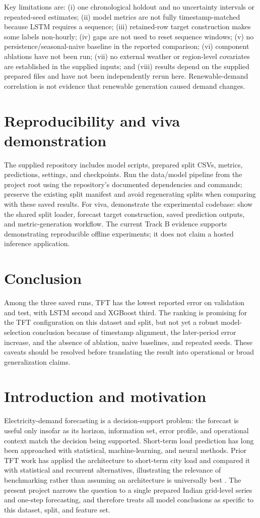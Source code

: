 \documentclass[12pt,a4paper]{article}
\begin{document}
Key limitations are: (i) one chronological holdout and no uncertainty intervals or repeated-seed estimates; (ii) model metrics are not fully timestamp-matched because LSTM requires a sequence; (iii) retained-row target construction makes some labels non-hourly; (iv) gaps are not used to reset sequence windows; (v) no persistence/seasonal-naive baseline in the reported comparison; (vi) component ablations have not been run; (vii) no external weather or region-level covariates are established in the supplied inputs; and (viii) results depend on the supplied prepared files and have not been independently rerun here. Renewable-demand correlation is not evidence that renewable generation caused demand changes.
\section{Reproducibility and viva demonstration}
The supplied repository includes model scripts, prepared split CSVs, metrics, predictions, settings, and checkpoints. Run the data/model pipeline from the project root using the repository's documented dependencies and commands; preserve the existing split manifest and avoid regenerating splits when comparing with these saved results. For viva, demonstrate the experimental codebase: show the shared split loader, forecast target construction, saved prediction outputs, and metric-generation workflow. The current Track B evidence supports demonstrating reproducible offline experiments; it does not claim a hosted inference application.
\section{Conclusion}
Among the three saved runs, TFT has the lowest reported error on validation and test, with LSTM second and XGBoost third. The ranking is promising for the TFT configuration on this dataset and split, but not yet a robust model-selection conclusion because of timestamp alignment, the later-period error increase, and the absence of ablation, naive baselines, and repeated seeds. These caveats should be resolved before translating the result into operational or broad generalization claims.

\newpage
\section{Introduction and motivation}
Electricity-demand forecasting is a decision-support problem: the forecast is useful only insofar as its horizon, information set, error profile, and operational context match the decision being supported. Short-term load prediction has long been approached with statistical, machine-learning, and neural methods. Prior TFT work has applied the architecture to short-term city load and compared it with statistical and recurrent alternatives, illustrating the relevance of benchmarking rather than assuming an architecture is universally best \cite{pham2022}. The present project narrows the question to a single prepared Indian grid-level series and one-step forecasting, and therefore treats all model conclusions as specific to this dataset, split, and feature set.
\end{document}
